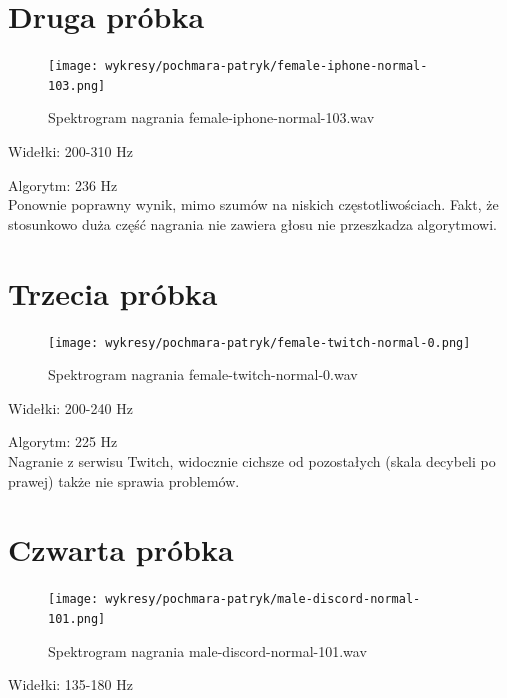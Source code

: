 \documentclass[a4paper,12pt]{extarticle}
\begin{document}
\newpage

\section*{Druga próbka}

\begin{figure}[h!]
\centering
\texttt{[image: wykresy/pochmara-patryk/female-iphone-normal-103.png]}
\caption{Spektrogram nagrania female-iphone-normal-103.wav}
\end{figure}

\noindent Widełki: 200-310 Hz

\noindent Algorytm: 236 Hz\\

\noindent Ponownie poprawny wynik, mimo szumów na niskich częstotliwościach. Fakt, że stosunkowo duża część nagrania nie zawiera głosu nie przeszkadza algorytmowi.

\newpage

\section*{Trzecia próbka}

\begin{figure}[h!]
\centering
\texttt{[image: wykresy/pochmara-patryk/female-twitch-normal-0.png]}
\caption{Spektrogram nagrania female-twitch-normal-0.wav}
\end{figure}

\noindent Widełki: 200-240 Hz

\noindent Algorytm: 225 Hz\\

\noindent Nagranie z serwisu Twitch, widocznie cichsze od pozostałych (skala decybeli po prawej) także nie sprawia problemów.

\newpage

\section*{Czwarta próbka}

\begin{figure}[h!]
\centering
\texttt{[image: wykresy/pochmara-patryk/male-discord-normal-101.png]}
\caption{Spektrogram nagrania male-discord-normal-101.wav}
\end{figure}

\noindent Widełki: 135-180 Hz
\end{document}
